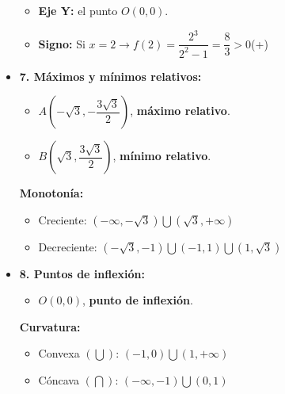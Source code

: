 \begin{itemize}
\begin{itemize}
		\item \textbf{Eje Y: }el punto $O(0,0)$.
		\item \textbf{Signo: }Si $x=2 \rightarrow f(2)=\dfrac{2^3}{2^2-1}=\dfrac{8}{3}>0$(+)
	\end{itemize}
	\item \textbf{7. Máximos y mínimos relativos:}\\
	\begin{itemize}
		\item $A(-\sqrt{3}, -\dfrac{3\sqrt{3}}{2})$, \textbf{máximo relativo}.\\
		\item $B(\sqrt{3}, \dfrac{3\sqrt{3}}{2})$, \textbf{mínimo relativo}.
	\end{itemize}
	\textbf{Monotonía: }\\
	\begin{itemize}
		\item Creciente: $(-\infty, -\sqrt{3}) \bigcup (\sqrt{3}, +\infty)$
		\item Decreciente: $(-\sqrt{3}, -1) \bigcup (-1, 1) \bigcup (1, \sqrt{3})$
	\end{itemize}
	\item \textbf{8. Puntos de inflexión:}\\
	\begin{itemize}
		\item $ O(0,0)$, \textbf{punto de inflexión}.
	\end{itemize}
	\textbf{Curvatura:}\\
	\begin{itemize}
		\item Convexa $(\bigcup)$: $(-1, 0) \bigcup (1, +\infty)$
		\item Cóncava $(\bigcap)$: $(-\infty, -1) \bigcup (0,1)$
	\end{itemize}	
\end{itemize}
